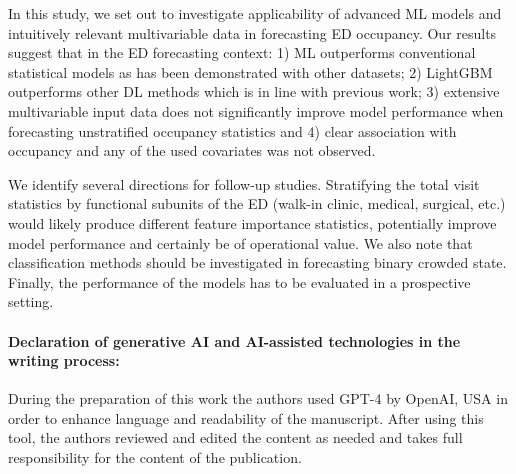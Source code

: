 In this study, we set out to investigate applicability of advanced ML models and intuitively relevant multivariable data in forecasting ED occupancy. Our results suggest that in the ED forecasting context: 1) ML outperforms conventional statistical models as has been demonstrated with other datasets; 2) LightGBM outperforms other DL methods which is in line with previous work; 3) extensive multivariable input data does not significantly improve model performance when forecasting unstratified occupancy statistics and 4) clear association with occupancy and any of the used covariates was not observed.

We identify several directions for follow-up studies.  Stratifying the total visit statistics by functional subunits of the ED (walk-in clinic, medical, surgical, etc.) would likely produce different feature importance statistics, potentially improve model performance and certainly be of operational value. We also note that classification methods should be investigated in forecasting binary crowded state. Finally, the performance of the models has to be evaluated in a prospective setting. 

\paragraph{Declaration of generative AI and AI-assisted technologies in the writing process:} During the preparation of this work the authors used GPT-4 by OpenAI, USA in order to enhance language and readability of the manuscript. After using this tool, the authors reviewed and edited the content as needed and takes full responsibility for the content of the publication.